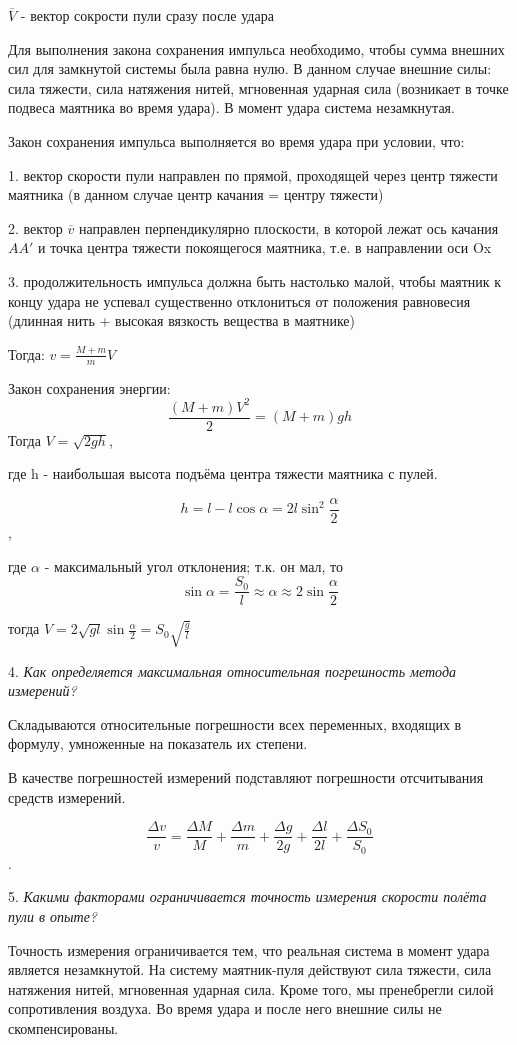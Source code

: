 \documentclass[12pt, letterpaper]{article}
\begin{document}
\(\overline{V}\) - вектор сокрости пули сразу после удара

Для выполнения закона сохранения импульса необходимо, чтобы сумма внешних сил для замкнутой системы была равна нулю. В данном случае внешние силы: сила тяжести, сила натяжения нитей, мгновенная ударная сила (возникает в точке подвеса маятника во время удара). В момент удара система незамкнутая.

Закон сохранения импульса выполняется во время удара при условии, что:

1. вектор скорости пули направлен по прямой, проходящей через центр тяжести маятника (в данном случае центр качания = центру тяжести)

2. вектор \(\overline{v}\) направлен перпендикулярно плоскости, в которой лежат ось качания \(AA'\) и точка центра тяжести покоящегося маятника, т.е. в направлении оси Ox

3. продолжительность импульса должна быть настолько малой, чтобы маятник к концу удара не успевал существенно отклониться от положения равновесия (длинная нить + высокая вязкость вещества в маятнике)

Тогда: \(v=\frac{M+m}{m}V\)

Закон сохранения энергии:
\[\frac{(M+m)V^2}{2}=(M+m)gh\]
Тогда \(V=\sqrt{2gh}\),

где h - наибольшая высота подъёма центра тяжести маятника с пулей.

\[h=l-l\cos \alpha =2l\sin^2 \frac{\alpha}{2}\],

где \(\alpha\) - максимальный угол отклонения; т.к. он мал, то
\[\sin \alpha = \frac{S_0}{l} \approx \alpha \approx 2 \sin \frac{\alpha}{2}\]

тогда \(V=2\sqrt{gl} \sin \frac{\alpha}{2} = S_0 \sqrt{\frac{g}{l}}\)\newline

4. \textit{Как определяется максимальная относительная погрешность метода измерений?}

Складываются относительные погрешности всех переменных, входящих в формулу, умноженные на показатель их степени.

В качестве погрешностей измерений подставляют погрешности отсчитывания средств измерений.

\[\frac{\Delta v}{v}=\frac{\Delta M}{M}+\frac{\Delta m}{m}+\frac{\Delta g}{2g}+\frac{\Delta l}{2l}+\frac{\Delta S_0}{S_0}\].\newline

5. \textit{Какими факторами ограничивается точность измерения скорости полёта пули в опыте?}

Точность измерения ограничивается тем, что реальная система в момент удара является незамкнутой. На систему маятник-пуля действуют сила тяжести, сила натяжения нитей, мгновенная ударная сила. Кроме того, мы пренебрегли силой сопротивления воздуха. Во время удара и после него внешние силы не скомпенсированы.
\end{document}
